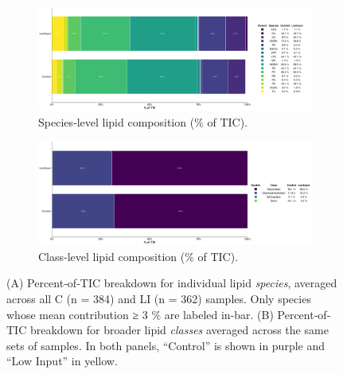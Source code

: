 \documentclass[10pt,letterpaper]{article}
\begin{document}
\begin{figure}[htp]
  \centering

  \begin{subfigure}[t]{\textwidth}
    \centering
    \includegraphics[width=\textwidth]{fig/main/Fig1a_lipid_species.png}
    \caption{Species‐level lipid composition (\% of TIC).}
    \label{fig:1A_lipid_species}
  \end{subfigure}

  \vspace{1em} %

  \begin{subfigure}[t]{\textwidth}
    \centering
    \includegraphics[width=\textwidth]{fig/main/Fig1b_lipid_class.png}
    \caption{Class‐level lipid composition (\% of TIC).}
    \label{fig:1B_lipid_class}
  \end{subfigure}

  \vspace{0.5em}

  \caption{%
    (A) Percent‐of‐TIC breakdown for individual lipid \emph{species}, averaged across all C (n = 384) and LI (n = 362) samples. Only species whose mean contribution ≥ 3 \% are labeled in‐bar.  
    (B) Percent‐of‐TIC breakdown for broader lipid \emph{classes} averaged across the same sets of samples.  
    In both panels, “Control” is shown in purple and “Low Input” in yellow.}
  \label{fig:lipid_main}
\end{figure}
\end{document}
